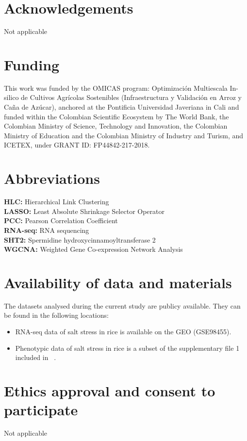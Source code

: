 \section*{Acknowledgements}%
Not applicable

\section*{Funding}%
This work was funded by the OMICAS program: Optimización Multiescala In-silico de
Cultivos Agrícolas Sostenibles (Infraestructura y Validación en Arroz y Caña de Azúcar),
anchored at the Pontificia Universidad Javeriana in Cali and funded within the Colombian
Scientific Ecosystem by The World Bank, the Colombian Ministry of Science, Technology and
Innovation, the Colombian Ministry of Education and the Colombian Ministry of Industry 
and Turism, and ICETEX, under GRANT ID: FP44842-217-2018.

\section*{Abbreviations}%
\textbf{HLC:} Hierarchical Link Clustering\\
\textbf{LASSO:} Least Absolute Shrinkage Selector Operator\\
\textbf{PCC:} Pearson Correlation Coefficient\\
\textbf{RNA-seq:} RNA sequencing\\
\textbf{SHT2:} Spermidine hydroxycinnamoyltransferase 2\\
\textbf{WGCNA:} Weighted Gene Co-expression Network Analysis

\section*{Availability of data and materials}%
The datasets analysed during the current study are publicy available. They can be found in the following locations:
\begin{itemize}
\item RNA-seq data of salt stress in rice is available on the GEO (GSE98455).
\item Phenotypic data of salt stress in rice is a subset of the supplementary file 1 included in ~\cite{campbell2017allelic}.
\end{itemize}

\section*{Ethics approval and consent to participate}%
Not applicable

